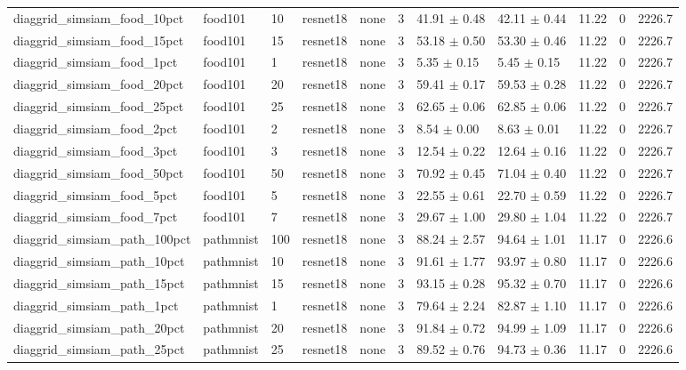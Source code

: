 \begin{tabular}{lllllllllll}
diaggrid_simsiam_food_10pct & food101 & 10 & resnet18 & none & 3 & 41.91 $\pm$ 0.48 & 42.11 $\pm$ 0.44 & 11.22 & 0 & 2226.7 \\
diaggrid_simsiam_food_15pct & food101 & 15 & resnet18 & none & 3 & 53.18 $\pm$ 0.50 & 53.30 $\pm$ 0.46 & 11.22 & 0 & 2226.7 \\
diaggrid_simsiam_food_1pct & food101 & 1 & resnet18 & none & 3 & 5.35 $\pm$ 0.15 & 5.45 $\pm$ 0.15 & 11.22 & 0 & 2226.7 \\
diaggrid_simsiam_food_20pct & food101 & 20 & resnet18 & none & 3 & 59.41 $\pm$ 0.17 & 59.53 $\pm$ 0.28 & 11.22 & 0 & 2226.7 \\
diaggrid_simsiam_food_25pct & food101 & 25 & resnet18 & none & 3 & 62.65 $\pm$ 0.06 & 62.85 $\pm$ 0.06 & 11.22 & 0 & 2226.7 \\
diaggrid_simsiam_food_2pct & food101 & 2 & resnet18 & none & 3 & 8.54 $\pm$ 0.00 & 8.63 $\pm$ 0.01 & 11.22 & 0 & 2226.7 \\
diaggrid_simsiam_food_3pct & food101 & 3 & resnet18 & none & 3 & 12.54 $\pm$ 0.22 & 12.64 $\pm$ 0.16 & 11.22 & 0 & 2226.7 \\
diaggrid_simsiam_food_50pct & food101 & 50 & resnet18 & none & 3 & 70.92 $\pm$ 0.45 & 71.04 $\pm$ 0.40 & 11.22 & 0 & 2226.7 \\
diaggrid_simsiam_food_5pct & food101 & 5 & resnet18 & none & 3 & 22.55 $\pm$ 0.61 & 22.70 $\pm$ 0.59 & 11.22 & 0 & 2226.7 \\
diaggrid_simsiam_food_7pct & food101 & 7 & resnet18 & none & 3 & 29.67 $\pm$ 1.00 & 29.80 $\pm$ 1.04 & 11.22 & 0 & 2226.7 \\
diaggrid_simsiam_path_100pct & pathmnist & 100 & resnet18 & none & 3 & 88.24 $\pm$ 2.57 & 94.64 $\pm$ 1.01 & 11.17 & 0 & 2226.6 \\
diaggrid_simsiam_path_10pct & pathmnist & 10 & resnet18 & none & 3 & 91.61 $\pm$ 1.77 & 93.97 $\pm$ 0.80 & 11.17 & 0 & 2226.6 \\
diaggrid_simsiam_path_15pct & pathmnist & 15 & resnet18 & none & 3 & 93.15 $\pm$ 0.28 & 95.32 $\pm$ 0.70 & 11.17 & 0 & 2226.6 \\
diaggrid_simsiam_path_1pct & pathmnist & 1 & resnet18 & none & 3 & 79.64 $\pm$ 2.24 & 82.87 $\pm$ 1.10 & 11.17 & 0 & 2226.6 \\
diaggrid_simsiam_path_20pct & pathmnist & 20 & resnet18 & none & 3 & 91.84 $\pm$ 0.72 & 94.99 $\pm$ 1.09 & 11.17 & 0 & 2226.6 \\
diaggrid_simsiam_path_25pct & pathmnist & 25 & resnet18 & none & 3 & 89.52 $\pm$ 0.76 & 94.73 $\pm$ 0.36 & 11.17 & 0 & 2226.6 \\

\end{tabular}
